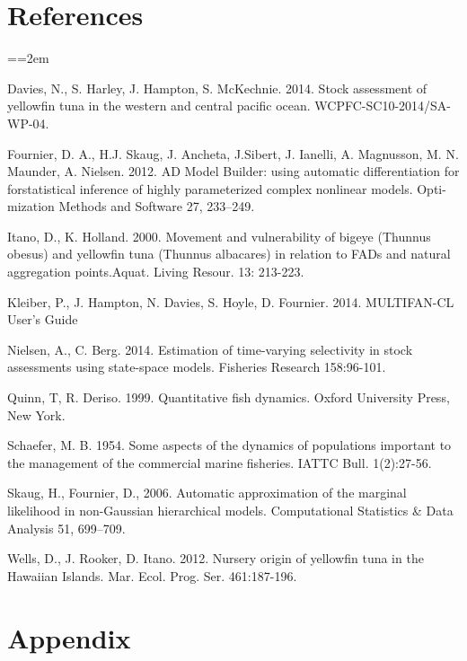 \documentclass[12pt,letterpaper,twoside]{article}
\newcommand\doublespacing{\baselineskip=1.6\normalbaselineskip}
\begin{document}
\section*{References}
{\parindent=0cm \small
\everypar={\hangindent=2em }\par

Davies, N., S. Harley, J. Hampton, S. McKechnie. 2014. Stock
assessment of yellowfin tuna in the western and central pacific ocean.
WCPFC-SC10-2014/SA-WP-04.

Fournier, D. A., H.J. Skaug, J. Ancheta, J.Sibert, J. Ianelli, 
A. Magnusson, M. N. Maunder, A. Nielsen. 2012. AD Model Builder:
using automatic differentiation for forstatistical inference of highly
parameterized complex nonlinear models. Opti-mization Methods and
Software 27, 233–249.

Itano, D., K. Holland. 2000.  Movement and vulnerability of bigeye
(Thunnus obesus) and yellowfin tuna (Thunnus albacares) in relation to
FADs and natural aggregation points.Aquat. Living Resour. 13: 213-223.

Kleiber, P., J. Hampton, N. Davies, S. Hoyle, D. Fournier. 2014.
MULTIFAN-CL User’s Guide

Nielsen, A., C. Berg. 2014. Estimation of time-varying selectivity
in stock assessments using state-space models. Fisheries Research
158:96-101.

Quinn, T, R. Deriso. 1999. Quantitative fish dynamics. Oxford
University Press, New York.

Schaefer, M. B. 1954. Some aspects of the dynamics of populations
important to the management of the commercial marine fisheries. IATTC
Bull. 1(2):27-56.

Skaug, H., Fournier, D., 2006. Automatic approximation of the marginal
likelihood in non-Gaussian hierarchical models. Computational
Statistics \& Data Analysis 51, 699–709.

Wells, D., J. Rooker, D. Itano. 2012.  Nursery origin of yellowfin
tuna in the Hawaiian Islands. Mar. Ecol. Prog. Ser. 461:187-196. 
\par}

\clearpage


\section*{Appendix}
\appendix
\end{document}
